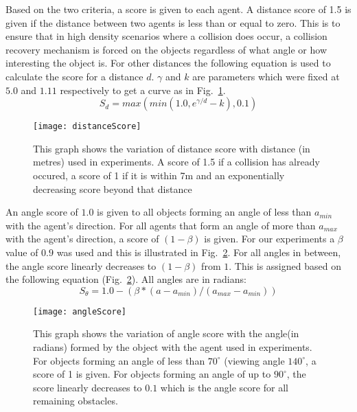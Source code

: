 Based on the two criteria, a score is given to each agent. A distance score of 1.5 is given if the distance between two agents is less than or equal to zero. This is to ensure that in high density scenarios where a collision does occur, a collision recovery mechanism is forced on the objects regardless of what angle or how interesting the object is. For other distances the following equation is used to calculate the score for a distance $d$. $\gamma$ and $k$ are parameters which were fixed at $5.0$ and $1.11$ respectively to get a curve as in Fig.~\ref{fig:DistanceScore}.
\begin{equation}
  	S_d = max(min(1.0, e^{\gamma / d} - k),0.1)
\end{equation}

\begin{figure}[!t]
\centering
\texttt{[image: distanceScore]}
\caption[Distance Score]{This graph shows the variation of distance score with distance (in metres) used in experiments. A score of 1.5 if a collision has already occured, a score of 1 if it is within 7m and an exponentially decreasing score beyond that distance}
\label{fig:DistanceScore}
\end{figure}

An angle score of $1.0$ is given to all objects forming an angle of less than $a_{min}$ with the agent's direction. For all agents that form an angle of more than $a_{max} $ with the agent's direction,  a score of $ (1-\beta) $ is given. For our experiments a $\beta$ value of $0.9$ was used and this is illustrated in Fig.~\ref{fig:AngleScore}. For all angles in between, the angle score linearly decreases to $ (1-\beta) $ from $1$. This is assigned based on the following equation (Fig.~\ref{fig:AngleScore}). All angles are in radians:
\begin{equation}
	S_{\theta} = 1.0 - (\beta * (a - a_{min} ) / (a_{max}-a_{min}))
\end{equation}

\begin{figure}[!t]
\centering
\texttt{[image: angleScore]}
\caption[Angle Score]{This graph shows the variation of angle score with the angle(in radians) formed by the object with the agent used in experiments. For objects forming an angle of less than $70^{\circ}$ (viewing angle $140^{\circ}$, a score of 1 is given. For objects forming an angle of up to $90^{\circ}$, the score linearly decreases to $0.1$ which is the angle score for all remaining obstacles.}
\label{fig:AngleScore}
\end{figure}


